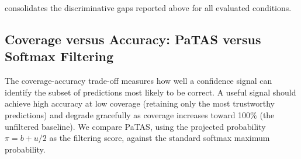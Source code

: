  consolidates the discriminative gaps reported above for all evaluated conditions.
\begin{table}[h]
\centering
\caption{Discriminative gap $\Delta x = \bar{x}_c - \bar{x}_w$ between correct ($c$) and wrong ($w$) predictions. Disbelief is zero or near-zero throughout because the feature trust fed into the trust feedforward is fully trusted.}
\label{tab:delta_bdu_summary}
\end{table}

\subsection{Coverage versus Accuracy: \ac{PaTAS} versus Softmax Filtering}
\label{sec:selective_prediction}
The coverage-accuracy trade-off measures how well a confidence signal can identify the subset of predictions most likely to be correct. A useful signal should achieve high accuracy at low coverage (retaining only the most trustworthy predictions) and degrade gracefully as coverage increases toward 100\% (the unfiltered baseline). We compare \ac{PaTAS}, using the projected probability $\pi = b + u/2$ as the filtering score, against the standard softmax maximum probability.

